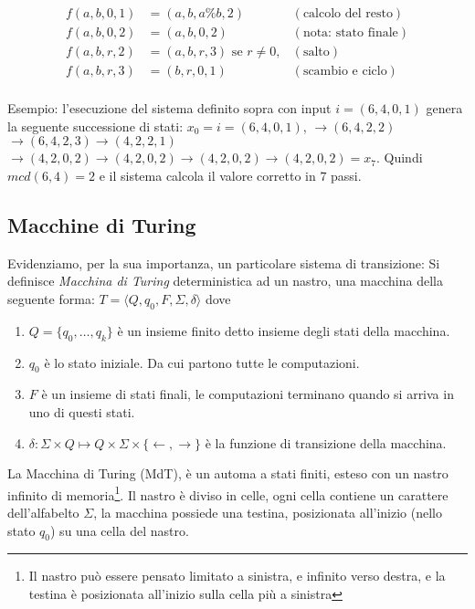 \[
\begin{aligned}
   f(a,b,0,1) &= (a,b, a \% b, 2) & (\text{calcolo del resto})\\
   f(a,b,0,2) &= (a,b,0,2) & (\text{nota: stato finale})\\
   f(a,b,r,2) &= (a,b,r,3) \text{ se } r \neq 0, & (\text{salto})\\
   f(a,b,r,3) &= (b,r,0,1) & (\text{scambio e ciclo})\\
\end{aligned}
\]

Esempio: l'esecuzione del sistema definito sopra con input $i = (6,4,0,1)$ genera la seguente
successione di stati: $x_0 = i = (6,4,0,1)$, $\rightarrow (6,4,2,2)$ 
$ \rightarrow (6,4,2,3) \rightarrow (4,2,2,1)$ 
$ \rightarrow (4,2,0,2) \rightarrow (4,2,0,2) \rightarrow (4,2,0,2)
\rightarrow (4,2,0,2) = x_7$. Quindi $mcd(6,4) = 2$ e il sistema calcola il valore
corretto in $7$ passi.

\subsection{Macchine di Turing}

Evidenziamo, per la sua importanza, un particolare sistema di transizione: Si definisce \emph{Macchina di Turing} deterministica ad un nastro, una macchina della seguente forma:
$T = \langle Q, q_0, F, \Sigma, \delta \rangle$ dove
\begin{enumerate}
 \item $Q = \{ q_0, \ldots, q_k \}$ è un insieme finito detto insieme degli stati della macchina.
 \item $q_0$ è lo stato iniziale. Da cui partono tutte le computazioni.
 \item $F$ è un insieme di stati finali, le computazioni terminano quando si arriva in uno di questi stati.
 \item $\delta : \Sigma \times Q \mapsto Q \times \Sigma \times \{\leftarrow, \rightarrow\}$ è la funzione di transizione della macchina.
\end{enumerate}

La Macchina di Turing (MdT), è un automa a stati finiti, esteso con un nastro infinito di memoria\footnote{Il nastro può essere pensato limitato a sinistra, e infinito verso destra, e la testina è posizionata all'inizio sulla cella più a sinistra}. Il nastro è diviso in celle, ogni cella contiene un carattere dell'alfabelto $\Sigma$, la macchina possiede una testina, posizionata all'inizio (nello stato $q_0$) su una cella del nastro. 


